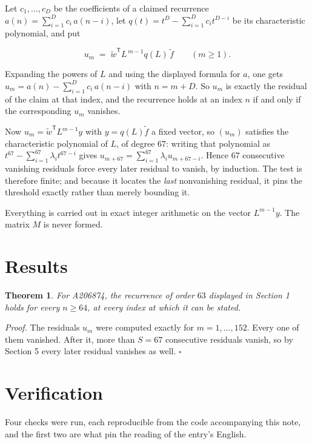 \documentclass[11pt]{article}
\newtheorem{theorem}{Theorem}
\theoremstyle{definition}
\begin{document}
Let $c_1,\dots,c_D$ be the coefficients of a claimed recurrence $a(n) = \sum_{i=1}^{D} c_i\,a(n-i)$, let $q(t) = t^{D} - \sum_{i=1}^{D} c_i t^{D-i}$ be its characteristic polynomial, and put

\[u_m \;=\; \tilde w^{\mathsf T} L^{\,m-1} q(L)\,\tilde f \qquad (m \ge 1).\]

Expanding the powers of $L$ and using the displayed formula for $a$, one gets $u_m = a(n) - \sum_{i=1}^{D} c_i\,a(n-i)$ with $n = m + D$. So $u_m$ is exactly the residual of the claim at that index, and the recurrence holds at an index $n$ if and only if the corresponding $u_m$ vanishes.

Now $u_m = \tilde w^{\mathsf T} L^{m-1} y$ with $y = q(L)\tilde f$ a fixed vector, so $(u_m)$ satisfies the characteristic polynomial of $L$, of degree $67$: writing that polynomial as $t^{67} - \sum_{i=1}^{67} \lambda_i t^{67-i}$ gives $u_{m+67} = \sum_{i=1}^{67} \lambda_i u_{m+67-i}$. Hence $67$ consecutive vanishing residuals force every later residual to vanish, by induction. The test is therefore finite; and because it locates the {\itshape last} nonvanishing residual, it pins the threshold exactly rather than merely bounding it.

Everything is carried out in exact integer arithmetic on the vector $L^{m-1}y$. The matrix $M$ is never formed.

\section{Results}

\begin{theorem} For A206874, the recurrence of order $63$ displayed in Section 1 holds for every $n \ge 64$, at every index at which it can be stated.\end{theorem}

{\itshape Proof.} The residuals $u_m$ were computed exactly for $m = 1,\dots,152$. Every one of them vanished. After it, more than $S = 67$ consecutive residuals vanish, so by Section 5 every later residual vanishes as well. $\square$

\section{Verification}

Four checks were run, each reproducible from the code accompanying this note, and the first two are what pin the reading of the entry's English.
\end{document}
